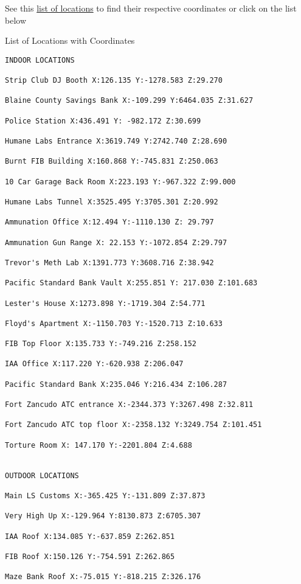 \documentclass[
  openany]{book}
\begin{document}
See this \href{https://gtaforums.com/topic/792877-list-of-over-100-coordinates-more-comming/}{list of locations} to find their respective coordinates or click on the list below

List of Locations with Coordinates

\begin{verbatim}
INDOOR LOCATIONS
 
Strip Club DJ Booth X:126.135 Y:-1278.583 Z:29.270

Blaine County Savings Bank X:-109.299 Y:6464.035 Z:31.627

Police Station X:436.491 Y: -982.172 Z:30.699

Humane Labs Entrance X:3619.749 Y:2742.740 Z:28.690

Burnt FIB Building X:160.868 Y:-745.831 Z:250.063

10 Car Garage Back Room X:223.193 Y:-967.322 Z:99.000

Humane Labs Tunnel X:3525.495 Y:3705.301 Z:20.992

Ammunation Office X:12.494 Y:-1110.130 Z: 29.797

Ammunation Gun Range X: 22.153 Y:-1072.854 Z:29.797

Trevor's Meth Lab X:1391.773 Y:3608.716 Z:38.942

Pacific Standard Bank Vault X:255.851 Y: 217.030 Z:101.683

Lester's House X:1273.898 Y:-1719.304 Z:54.771

Floyd's Apartment X:-1150.703 Y:-1520.713 Z:10.633

FIB Top Floor X:135.733 Y:-749.216 Z:258.152

IAA Office X:117.220 Y:-620.938 Z:206.047

Pacific Standard Bank X:235.046 Y:216.434 Z:106.287

Fort Zancudo ATC entrance X:-2344.373 Y:3267.498 Z:32.811

Fort Zancudo ATC top floor X:-2358.132 Y:3249.754 Z:101.451

Torture Room X: 147.170 Y:-2201.804 Z:4.688

 
OUTDOOR LOCATIONS
 
Main LS Customs X:-365.425 Y:-131.809 Z:37.873

Very High Up X:-129.964 Y:8130.873 Z:6705.307

IAA Roof X:134.085 Y:-637.859 Z:262.851

FIB Roof X:150.126 Y:-754.591 Z:262.865

Maze Bank Roof X:-75.015 Y:-818.215 Z:326.176


\end{verbatim}
\end{document}

